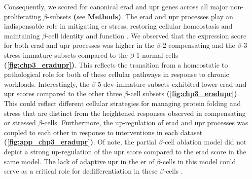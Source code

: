 \par Consequently, we scored for canonical \gls{erad} and \gls{upr} genes across all major non-proliferating $\beta$-subsets \textbf{(}see \hyperref[subsubsec:met_chp3_scoring]{\textbf{Methods}}\textbf{)}. The \gls{erad} and \gls{upr} processes play an indispensable role in mitigating \gls{er} stress, restoring cellular homeostasis and maintaining $\beta$-cell identity and function \textbf{\cite{oppenlander_vertical_2021}}. We observed that the expression score for both \gls{erad} and \gls{upr} processes was higher in the $\beta$-2 compensating and the $\beta$-3 stress-immature subsets compared to the $\beta$-1 normal cells \textbf{(\autoref{fig:chp3_eradupr})}. This reflects the transition from a homeostatic to pathological role for both of these cellular pathways in response to chronic workloads. Interestingly, the $\beta$-5 dev-immature subsets exhibited lower \gls{erad} and \gls{upr} scores compared to the other three $\beta$-cell subsets \textbf{(\autoref{fig:chp3_eradupr})}. This could reflect different cellular strategies for managing protein folding and stress that are distinct from the heightened responses observed in compensating or stressed $\beta$-cells. Furthermore, the up-regulation of \gls{erad} and \gls{upr} processes was coupled to each other in response to interventions in each dataset \textbf{(\autoref{fig:app_chp3_eradupr})}. Of note, the partial $\beta$-cell ablation model did not depict a strong up-regulation of the \gls{upr} score compared to the \gls{erad} score in the same model. The lack of adaptive \gls{upr} in the \gls{er} of $\beta$-cells in this model could serve as a critical role for dedifferentiation in these $\beta$-cells \textbf{\cite{sachs_targeted_2020,khin_brief_2021}}.\\




